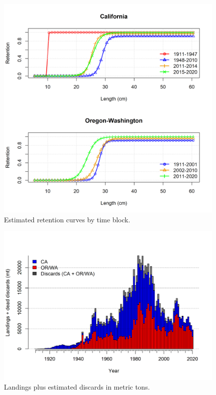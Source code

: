 \documentclass[11pt,
  english,
  a4paper,
]{article}
\begin{document}
\begin{figure}
\centering
\includegraphics[width=1\textwidth,height=1\textheight]{figs/dover_retention.png}
\caption{Estimated retention curves by time block.\label{fig:retention}}
\end{figure}

\tagmcend\tagstructend


\begin{figure}
\centering
\includegraphics[width=1\textwidth,height=1\textheight]{figs/catch_w_discards.png}
\caption{Landings plus estimated discards in metric tons.\label{fig:landings-discard}}
\end{figure}
\end{document}
